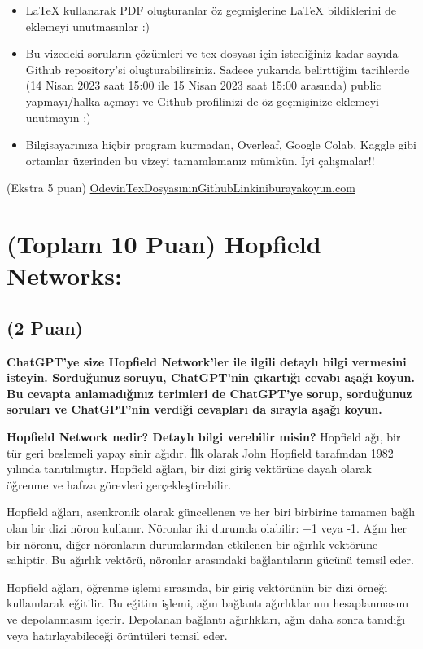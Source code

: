 \documentclass[11pt]{article}
\begin{document}
\begin{itemize}
    \item LaTeX kullanarak PDF oluşturanlar öz geçmişlerine LaTeX bildiklerini de eklemeyi unutmasınlar :)
    \item Bu vizedeki soruların çözümleri ve tex dosyası için istediğiniz kadar sayıda Github repository'si oluşturabilirsiniz. Sadece yukarıda belirttiğim tarihlerde (14 Nisan 2023 saat 15:00 ile 15 Nisan 2023 saat 15:00 arasında) public yapmayı/halka açmayı ve Github profilinizi de öz geçmişinize eklemeyi unutmayın :)
    \item Bilgisayarınıza hiçbir program kurmadan, Overleaf, Google Colab, Kaggle gibi ortamlar üzerinden bu vizeyi tamamlamanız mümkün. İyi çalışmalar!!
\end{itemize}

(Ekstra 5 puan) \url{OdevinTexDosyasınınGithubLinkiniburayakoyun.com}

\newpage
\section{(Toplam 10 Puan) Hopfield Networks:}

\subsection{(2 Puan)} \textbf{ChatGPT’ye size Hopfield Network’ler ile ilgili detaylı bilgi vermesini isteyin. Sorduğunuz soruyu, ChatGPT'nin çıkartığı cevabı aşağı koyun. Bu cevapta anlamadığınız terimleri de ChatGPT’ye sorup, sorduğunuz soruları ve ChatGPT’nin verdiği cevapları da sırayla aşağı koyun.}

\textbf{Hopfield Network nedir? Detaylı bilgi verebilir misin?}
Hopfield ağı, bir tür geri beslemeli yapay sinir ağıdır. İlk olarak John Hopfield tarafından 1982 yılında tanıtılmıştır. Hopfield ağları, bir dizi giriş vektörüne dayalı olarak öğrenme ve hafıza görevleri gerçekleştirebilir.

Hopfield ağları, asenkronik olarak güncellenen ve her biri birbirine tamamen bağlı olan bir dizi nöron kullanır. Nöronlar iki durumda olabilir: +1 veya -1. Ağın her bir nöronu, diğer nöronların durumlarından etkilenen bir ağırlık vektörüne sahiptir. Bu ağırlık vektörü, nöronlar arasındaki bağlantıların gücünü temsil eder.

Hopfield ağları, öğrenme işlemi sırasında, bir giriş vektörünün bir dizi örneği kullanılarak eğitilir. Bu eğitim işlemi, ağın bağlantı ağırlıklarının hesaplanmasını ve depolanmasını içerir. Depolanan bağlantı ağırlıkları, ağın daha sonra tanıdığı veya hatırlayabileceği örüntüleri temsil eder.
\end{document}
